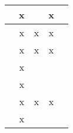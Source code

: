 \begin{table}[h]
\begin{tabular}{|l|l|l|l|l|}
		\cite{Flemisch2011}                                   & \multicolumn{1}{c|}{x}                                         & \multicolumn{1}{c|}{}                                               & \multicolumn{1}{c|}{x}                                              & \multicolumn{1}{c|}{}                                               \\ \hline
		\cite{Cao2002}                                   & \multicolumn{1}{c|}{x}                                         & \multicolumn{1}{c|}{x}                                               & \multicolumn{1}{c|}{x}                                              & \multicolumn{1}{c|}{}                                               \\ \hline
		\cite{DeBaun2005}                                   & \multicolumn{1}{c|}{x}                                         & \multicolumn{1}{c|}{x}                                               & \multicolumn{1}{c|}{x}                                              & \multicolumn{1}{c|}{}                                               \\ \hline
		\cite{Mohammad2017}                                  & \multicolumn{1}{c|}{x}                                         & \multicolumn{1}{c|}{}                                               & \multicolumn{1}{c|}{}                                              & \multicolumn{1}{c|}{}                                               \\ \hline
		\cite{WANG201519}                                   & \multicolumn{1}{c|}{x}                                         & \multicolumn{1}{c|}{}                                               & \multicolumn{1}{c|}{}                                              & \multicolumn{1}{c|}{}                                               \\ \hline
		\cite{ZHANG2007135}                                   & \multicolumn{1}{c|}{x}                                         & \multicolumn{1}{c|}{x}                                               & \multicolumn{1}{c|}{x}                                              & \multicolumn{1}{c|}{}                                               \\ \hline
		\cite{Wang2016Pol}                                   & \multicolumn{1}{c|}{x}                                         & \multicolumn{1}{c|}{}                                               & \multicolumn{1}{c|}{}                                              & \multicolumn{1}{c|}{}                                               \\ \hline

\end{tabular}
\end{table}
